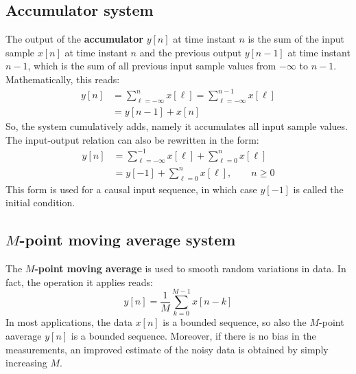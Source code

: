 \documentclass[../../main/main.tex]{subfiles}
\begin{document}
\subsection{Accumulator system}
The output of the \textbf{accumulator} \( y[n] \) at time instant \( n \) is the sum of the input sample \( x[n] \) at time instant \( n \) and the previous output \( y[n-1] \) at time instant \( n-1 \), which is the sum of all previous input sample values from \( - \infty \) to \( n-1 \). Mathematically, this reads:
\begin{align}
    y[n]
    &=
        \sum_{\ell = -\infty}^{n} x[\ell]
        =
        \sum_{\ell = -\infty}^{n-1} x[\ell] \nonumber   \\
    &=
        y[n-1] + x[n]
\end{align}
So, the system cumulatively adds, namely it accumulates all input sample values. The input-output relation can also be rewritten in the form:
\begin{align}
    y[n]
    &=
        \sum_{\ell = -\infty}^{-1} x[\ell] + \sum_{\ell = 0}^{n} x[\ell]    \nonumber   \\
    &=
        y[-1] + \sum_{\ell = 0}^{n} x[\ell],
        \qquad
        n \ge 0
\end{align}
This form is used for a causal input sequence, in which case \( y[-1] \) is called the initial condition.



\subsection{\( M \)-point moving average system}
The \textbf{\( M \)-point moving average} is used to smooth random variations in data. In fact, the operation it applies reads:
\begin{equation}
    y[n]
    =
    \frac{1}{M} \sum_{k=0}^{M-1} x[n-k]
    \label{eq:L03_S07_1}
\end{equation}
In most applications, the data \( x[n] \) is a bounded sequence, so also the \( M \)-point aaverage \( y[n] \) is a bounded sequence. Moreover, if there is no bias in the measurements, an improved estimate of the noisy data is obtained by simply increasing \( M \).
\end{document}

